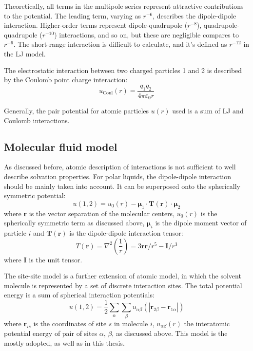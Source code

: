 Theoretically, all terms in the multipole series represent attractive
contributions to the potential. The leading term, varying as $r^{-6}$,
describes the dipole-dipole interaction. Higher-order terms represent
dipole-quadrupole ($r^{-8}$), quadrupole-quadrupole ($r^{-10}$)
interactions, and so on, but these are negligible compares to $r^{-6}$.
The short-range interaction is difficult to calculate, and it's defined
as $r^{-12}$ in the LJ model. 

The electrostatic interaction between two charged particles 1 and
2 is described by the Coulomb point charge interaction:
\begin{equation}
u_{\mathrm{Coul}}(r)=\frac{q_{1}q_{2}}{4\pi\varepsilon_{0}r}
\end{equation}


Generally, the pair potential for atomic particles $u(r)$ used is
a sum of LJ and Coulomb interactions.


\subsection{Molecular fluid model}

As discussed before, atomic description of interactions is not sufficient
to well describe solvation properties. For polar liquids, the dipole-dipole
interaction should be mainly taken into account. It can be superposed
onto the spherically symmetric potential:
\begin{equation}
u(1,2)=u_{0}(r)-\boldsymbol{\mu}_{1}\cdot\mathbf{T}(\mathbf{r})\cdot\boldsymbol{\mu}_{2}
\end{equation}
where $\mathbf{r}$ is the vector separation of the molecular centers,
$u_{0}(r)$ is the spherically symmetric term as discussed above,
$\boldsymbol{\mu}_{i}$ is the dipole moment vector of particle $i$
and $\mathbf{T}(\mathbf{r})$ is the dipole-dipole interaction tensor:
\begin{equation}
T(\mathbf{r})=\nabla^{2}\left(\dfrac{1}{r}\right)=3\mathbf{r}\mathbf{r}/r^{5}-\mathbf{I}/r^{3}
\end{equation}
where $\mathbf{I}$ is the unit tensor.

The site-site model is a further extension of atomic model, in which
the solvent molecule is represented by a set of discrete interaction
sites. The total potential energy is a sum of spherical interaction
potentials: 
\begin{equation}
u(1,2)=\frac{1}{2}\sum_{\alpha}\sum_{\beta}u_{\alpha\beta}(\left|\mathbf{r}_{2\beta}-\mathbf{r}_{1\alpha}\right|)
\end{equation}
where $\mathbf{r}_{is}$ is the coordinates of site $s$ in molecule
$i$, $u_{\alpha\beta}(r)$ the interatomic potential energy of pair
of sites $\alpha$, $\beta$, as discussed above. This model is the
mostly adopted, as well as in this thesis.

